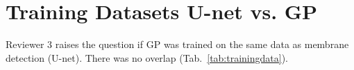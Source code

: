\documentclass[10pt,twocolumn,letterpaper]{article}
\begin{document}
%


\section{Training Datasets U-net vs. GP}
Reviewer 3 raises the question if GP was trained on the same data as membrane detection (U-net). There was no overlap (Tab.~\ref{tab:trainingdata}).
\end{document}
